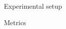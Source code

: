 \documentclass[final]{beamer}
\newcommand{\tablecaptionsep}{\vspace*{-0pt}}
\begin{document}
\begin{frame}[t]
\begin{columns}[T]
\begin{column}{.33\linewidth}
\begin{minipage}[T]{.97\textwidth}
{\begin{block}{Experimental setup}
\end{block}


        
        




\begin{block}{Metrics} %

            

\end{block}}
\end{minipage}
\end{column}
\end{columns}
\end{frame}
\end{document}
